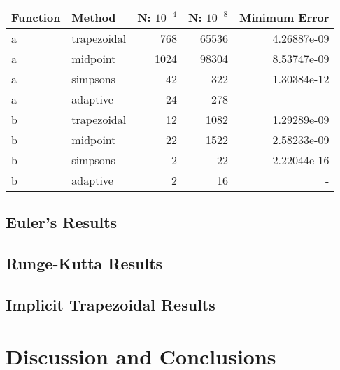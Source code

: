 \documentclass{article}
\begin{document}
\bgroup
\footnotesize
\def\arraystretch{1.5}
\begin{center}
	\centering
	\begin{tabular}{l|l|r|r|r}
	\textbf{Function} & \textbf{Method} & \textbf{N: $10^{-4}$} & \textbf{N: $10^{-8}$} &\textbf{Minimum Error} \\
	\hline
	a & trapezoidal & 768  & 65536 & 4.26887e-09 \\
    a & midpoint    & 1024 & 98304 & 8.53747e-09 \\
    a & simpsons    & 42   & 322   & 1.30384e-12 \\
    a & adaptive    & 24   & 278   & -           \\
    b & trapezoidal & 12   & 1082  & 1.29289e-09 \\
    b & midpoint    & 22   & 1522  & 2.58233e-09 \\
    b & simpsons    & 2    & 22    & 2.22044e-16 \\
    b & adaptive    & 2    & 16    & -
	\end{tabular}
	\label{table:results}
\end{center}
\egroup






\subsection{Euler's Results}
\label{results:euler}


\subsection{Runge-Kutta Results}\label{results:rk}


\subsection{Implicit Trapezoidal Results}\label{results:implicit}


\section{Discussion and Conclusions}
\label{conc}



\newpage


\end{document}
